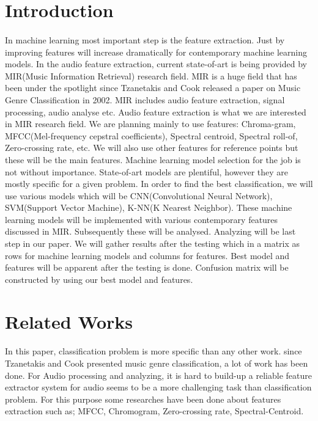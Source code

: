 \documentclass[10pt,twocolumn,letterpaper]{article}
\begin{document}
  \section{Introduction}
  \paragraph{}In machine learning most important step is the feature extraction. Just by improving features will increase dramatically for contemporary machine learning models. In the audio feature extraction, current state-of-art is being provided by MIR(Music Information Retrieval) research field. MIR is a huge field that has been under the spotlight since Tzanetakis and Cook released a paper on Music Genre Classification in 2002\cite{genre_classification_tp}. MIR includes audio feature extraction, signal processing, audio analyse etc. Audio feature extraction is what we are interested in MIR research field. We are planning mainly to use features: Chroma-gram, MFCC(Mel-frequency cepstral coefficients), Spectral centroid, Spectral roll-of, Zero-crossing rate, etc. We will also use other features for reference points but these will be the main features.
  Machine learning model selection for the job is not without importance. State-of-art models are plentiful, however they are mostly specific for a given problem. In order to find the best classification, we will use various models which will be CNN(Convolutional Neural Network), SVM(Support Vector Machine), K-NN(K Nearest Neighbor). These machine learning models will be implemented with various contemporary features discussed in MIR. Subsequently these will be analysed.   
  Analyzing will be last step in our paper. We will gather results after the testing which in a matrix as rows for machine learning models and columns for features. Best model and features will be apparent after the testing is done. Confusion matrix will be constructed by using our best model and features.   
  
  \section{Related Works}
  
  \paragraph{}In this paper, classification problem is more specific than any other work. since Tzanetakis and Cook presented music genre classification\cite{genre_classification_tp}, a lot of work has been done. 
  For Audio processing and analyzing, it is hard to build-up a reliable feature extractor system for audio seems to be a more challenging task than classification problem.
  For this purpose some researches have been done about features extraction such as; MFCC\cite{mffc}, Chromogram\cite{chroma}, Zero-crossing rate, Spectral-Centroid\cite{spectral_centroid}.
\end{document}
